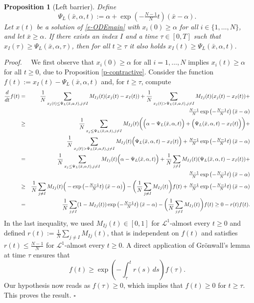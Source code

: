 \documentclass[journal]{article}
\newtheorem{proposition}[lemma]{Proposition}
\newenvironment{proof}{{\it Proof.}~~}{\hfill$\square$}
\begin{document}
\begin{proposition}[Left barrier]\label{p-barrier} Define $$\Psi_L(\bar x,\alpha,t):=\alpha+\exp\left(-\tfrac{N-1}N t\right)(\bar x-\alpha).$$
Let $x(t)$ be a solution of \eqref{e-ODEmain} with $x_i(0)\geq \alpha$ for all $i\in\{1,\ldots,N\}$,
and let $\bar x \geq\alpha$. If there exists an index $I$ and a time $\tau\in[0,T]$ such that $x_I(\tau)\geq \Psi_L(\bar x,\alpha,\tau)$, then for all $t\geq \tau$ it also holds $x_I(t)\geq \Psi_L(\bar x,\alpha,t)$.
\end{proposition}
\begin{proof} We first observe that $x_i(0)\geq \alpha$ for all $i=1,\ldots,N$ implies $x_i(t)\geq \alpha$ for all $t\geq 0$, due to Proposition \ref{p-contractive}. Consider the function $f(t):=x_I(t)-\Psi_L(\bar x,\alpha,t)$ and,  for $t\geq \tau$, compute
%
\begin{eqnarray}
\frac{d}{dt} f(t)&=&\frac1N \sum_{x_j(t) \leq \Psi_L(\bar x,\alpha,t),j\neq I} M_{Ij}(t)(x_j(t)-x_I(t))+\frac1N \sum_{x_j(t)> \Psi_L(\bar x,\alpha,t),j\neq I} M_{Ij}(t)(x_j(t)-x_I(t))+\nonumber \\
&& \tfrac{N-1}N \exp\left(-\tfrac{N-1}N t\right)(\bar x-\alpha)\nonumber \\
%
&\geq& \frac1N \sum_{x_j\leq \Psi_L(\bar x,\alpha,t),j\neq I} M_{Ij}(t)\bigg( \Big(\alpha-\Psi_L(\bar x,\alpha,t) \Big)   + \Big(\Psi_L(\bar x,\alpha,t)-x_I(t) \Big) \bigg) +\nonumber\\
&& \hspace{-5mm} \frac1N \sum_{x_j(t)> \Psi_L(\bar x,\alpha,t),j\neq I} M_{Ij}(t) \Big(\Psi_L(\bar x,\alpha,t)-x_I(t)\Big)  + \tfrac{N-1}N \exp\left(-\tfrac{N-1}N t\right)(\bar x-\alpha)\nonumber\\
&=& \frac1N \sum_{x_j\leq \Psi_L(\bar x,\alpha,t),j\neq I} M_{Ij}(t)\Big(\alpha-\Psi_L(\bar x,\alpha,t) \Big) + \frac1N \sum_{j\neq I} M_{Ij}(t)(\Psi_L(\bar x,\alpha,t)-x_I(t))+ \nonumber \\
%
&& \tfrac{N-1}N \exp\left(-\tfrac{N-1}N t\right)(\bar x-\alpha)\nonumber \\
%
&\geq &\frac1N \sum_{j\neq I} M_{Ij}(t) \Big(-  \exp\left(-\tfrac{N-1}N t\right)  (\bar x-\alpha) \Big)  - \bigg(\frac1N \sum_{j\neq I} M_{Ij}(t) \bigg) f(t) + \tfrac{N-1}N \exp\left(-\tfrac{N-1}N t\right)(\bar x-\alpha)\nonumber\\
&= &\frac1N \sum_{j\neq I} (1-M_{Ij}(t)) \exp\left(-\tfrac{N-1}N t\right)(\bar x-\alpha) 
 - \bigg(\frac1N \sum_{j\neq I} M_{Ij}(t) \bigg) f(t) \geq 0-r(t) f(t).
\label{e-stimaf}
\end{eqnarray}
In the last inequality, we used $M_{Ij}(t) \in[0,1]$ for $\mathcal{L}^1$-almost every $t \geq 0$ and defined $r(t):=\frac1N \sum_{j\neq I} M_{Ij}(t)$, that is independent on $f(t)$ and satisfies $r(t)\leq \frac{N-1}N$ for $\mathcal{L}^1$-almost every $t \geq 0$.
A direct application of Gr\"onwall's lemma at time $\tau$ ensures that
%
\begin{equation*}
f(t)\geq \exp\left(-\int_\tau^t r(s)\,ds\right) f(\tau).
\end{equation*}
%
Our hypothesis now reads as $f(\tau)\geq 0$, which implies that $f(t)\geq 0$ for $t\geq \tau$. This proves the result.
\end{proof}
\end{document}
